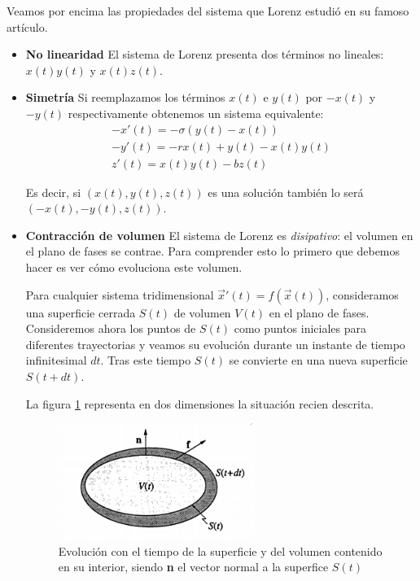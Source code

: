 Veamos por encima las propiedades del sistema que Lorenz estudió en su famoso artículo.

\begin{itemize}
\item \textbf{No linearidad}
El sistema de Lorenz presenta dos términos no lineales: $x(t)y(t)$ y $x(t)z(t)$.

\item \textbf{Simetría}
Si reemplazamos los términos $x(t)$ e $y(t)$ por $-x(t)$ y $-y(t)$ respectivamente obtenemos un sistema equivalente:
\[\begin{array}{l}
-x'(t) = -σ(y(t)-x(t)) \\
-y'(t) = -rx(t)+y(t)-x(t)y(t)\\
z'(t) = x(t)y(t)-bz(t)
\end{array}\]

Es decir, si $(x(t),y(t),z(t))$ es una solución también lo será $(-x(t),-y(t),z(t))$.

\item \textbf{Contracción de volumen}
El sistema de Lorenz es \emph{disipativo}: el volumen en el plano de fases se contrae. Para comprender esto lo primero que debemos hacer es ver cómo evoluciona este volumen.

Para cualquier sistema tridimensional $\vec{x}'(t) =f(\vec{x}(t))$, consideramos una superficie cerrada $S(t)$ de volumen $V(t)$ en el plano de fases. Consideremos ahora los puntos de $S(t)$ como puntos iniciales para diferentes trayectorias y veamos su evolución durante un instante de tiempo infinitesimal $dt$. Tras este tiempo $S(t)$ se convierte en una nueva superficie $S(t+dt)$.

La figura \ref{fig:volumen2D} representa en dos dimensiones la situación recien descrita.
\begin{figure}[hbtp]
\centering
\includegraphics[width = 0.6\textwidth]{img/volumen2D.png}
\caption{Evolución con el tiempo de la superficie y del volumen contenido en su interior, siendo \textbf{n} el vector normal a la superfice $S(t)$}
\label{fig:volumen2D}
\end{figure}


\end{itemize}
